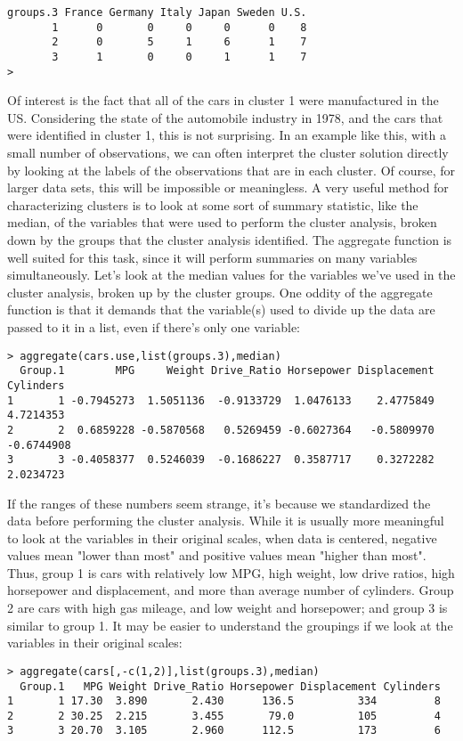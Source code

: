 {\begin{framed}
\begin{verbatim}
groups.3 France Germany Italy Japan Sweden U.S.
       1      0       0     0     0      0    8
       2      0       5     1     6      1    7
       3      1       0     0     1      1    7
>                                                 
\end{verbatim}
\end{framed}
Of interest is the fact that all of the cars in cluster 1 were manufactured in the US. Considering the state of the automobile industry in 1978, and the cars that were identified in cluster 1, this is not surprising.
In an example like this, with a small number of observations, we can often interpret the cluster solution directly by looking at the labels of the observations that are in each cluster. Of course, for larger data sets, this will be impossible or meaningless. A very useful method for characterizing clusters is to look at some sort of summary statistic, like the median, of the variables that were used to perform the cluster analysis, broken down by the groups that the cluster analysis identified. The aggregate function is well suited for this task, since it will perform summaries on many variables simultaneously. Let's look at the median values for the variables we've used in the cluster analysis, broken up by the cluster groups. One oddity of the aggregate function is that it demands that the variable(s) used to divide up the data are passed to it in a list, even if there's only one variable:
\begin{framed}
\begin{verbatim}
> aggregate(cars.use,list(groups.3),median)
  Group.1        MPG     Weight Drive_Ratio Horsepower Displacement  Cylinders
1       1 -0.7945273  1.5051136  -0.9133729  1.0476133    2.4775849  4.7214353
2       2  0.6859228 -0.5870568   0.5269459 -0.6027364   -0.5809970 -0.6744908
3       3 -0.4058377  0.5246039  -0.1686227  0.3587717    0.3272282  2.0234723

\end{verbatim}
\end{framed}
If the ranges of these numbers seem strange, it's because we standardized the data before performing the cluster analysis. While it is usually more meaningful to look at the variables in their original scales, when data is centered, negative values mean "lower than most" and positive values mean "higher than most". Thus, group 1 is cars with relatively low MPG, high weight, low drive ratios, high horsepower and displacement, and more than average number of cylinders. Group 2 are cars with high gas mileage, and low weight and horsepower; and group 3 is similar to group 1. It may be easier to understand the groupings if we look at the variables in their original scales:
\begin{framed}
\begin{verbatim}
> aggregate(cars[,-c(1,2)],list(groups.3),median)
  Group.1   MPG Weight Drive_Ratio Horsepower Displacement Cylinders
1       1 17.30  3.890       2.430      136.5          334         8
2       2 30.25  2.215       3.455       79.0          105         4
3       3 20.70  3.105       2.960      112.5          173         6
\end{verbatim}
\end{framed}

}
